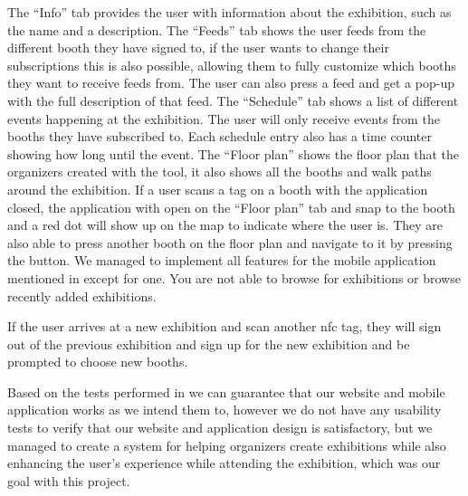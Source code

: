 The ``Info'' tab provides the user with information about the exhibition, such as the name and a description. The ``Feeds'' tab shows the user feeds from the different booth they have signed to, if the user wants to change their subscriptions this is also possible, allowing them to fully customize which booths they want to receive feeds from. The user can also press a feed and get a pop-up with the full description of that feed. The ``Schedule'' tab shows a list of different events happening at the exhibition. The user will only receive events from the booths they have subscribed to. Each schedule entry also has a time counter showing how long until the event. The ``Floor plan'' shows the floor plan that the organizers created with the tool, it also shows all the booths and walk paths around the exhibition. If a user scans a tag on a booth with the application closed, the application with open on the ``Floor plan'' tab and snap to the booth and a red dot will show up on the map to indicate where the user is. They are also able to press another booth on the floor plan and navigate to it by pressing the button. We managed to implement all features for the mobile application mentioned in  except for one. You are not able to browse for exhibitions or browse recently added exhibitions.

If the user arrives at a new exhibition and scan another \ac{nfc} tag, they will sign out of the previous exhibition and sign up for the new exhibition and be prompted to choose new booths. 

Based on the tests performed in  we can guarantee that our website and mobile application works as we intend them to, however we do not have any usability tests to verify that our website and application design is satisfactory, but we managed to create a system for helping organizers create exhibitions while also enhancing the user's experience while attending the exhibition, which was our goal with this project.